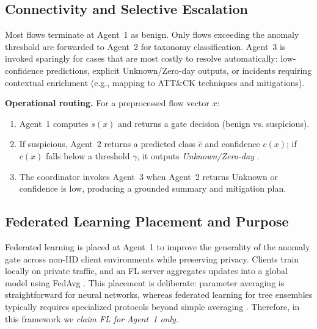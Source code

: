 \documentclass[conference]{IEEEtran}
\begin{document}
\subsection{Connectivity and Selective Escalation}
Most flows terminate at Agent~1 as benign. Only flows exceeding the anomaly threshold are forwarded to Agent~2 for taxonomy classification. Agent~3 is invoked sparingly for cases that are most costly to resolve automatically: low-confidence predictions, explicit Unknown/Zero-day outputs, or incidents requiring contextual enrichment (e.g., mapping to ATT\&CK techniques and mitigations).

\textbf{Operational routing.} For a preprocessed flow vector $x$:
\begin{enumerate}
  \item Agent~1 computes $s(x)$ and returns a gate decision (benign vs. suspicious).
  \item If suspicious, Agent~2 returns a predicted class $\hat{c}$ and confidence $c(x)$; if $c(x)$ falls below a threshold $\gamma$, it outputs \emph{Unknown/Zero-day} \cite{Scheirer2013OpenSet}.
  \item The coordinator invokes Agent~3 when Agent~2 returns Unknown or confidence is low, producing a grounded summary and mitigation plan.
\end{enumerate}

\subsection{Federated Learning Placement and Purpose}
Federated learning is placed at Agent~1 to improve the generality of the anomaly gate across non-IID client environments while preserving privacy. Clients train locally on private traffic, and an FL server aggregates updates into a global model using FedAvg \cite{mcmahan2017fedavg}. This placement is deliberate: parameter averaging is straightforward for neural networks, whereas federated learning for tree ensembles typically requires specialized protocols beyond simple averaging \cite{kairouz2021flsurvey}. Therefore, in this framework we \emph{claim FL for Agent~1 only}.
\end{document}
